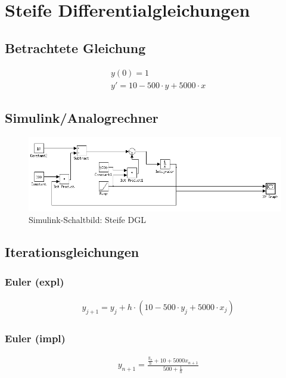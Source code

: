 \documentclass[10pt]{scrartcl}
\author{André Harm}
\title{\titletext}
\date{02.11.2011}
\begin{document}
\maketitle

\setcounter{tocdepth}{3}
\tableofcontents
\listoffigures
\lstlistoflistings


\section{Steife Differentialgleichungen}
	\subsection{Betrachtete Gleichung}
		\begin{align}
		&y(0) = 1\\
		&y' = 10 - 500 \cdot y + 5000 \cdot x
		\end{align}
		
	\subsection{Simulink/Analogrechner}
	
	\begin{figure}[htbp]
	\centering
		\includegraphics[scale=0.5]{simulink_aufg1_a}
	\caption{Simulink-Schaltbild: Steife DGL}
	\label{fig:simulinkAufg1}
	\end{figure}

	\subsection{Iterationsgleichungen}
		\subsubsection{Euler (expl)}
		\begin{align}
		&y_{j+1} = y_j + h \cdot ( 10 - 500 \cdot y_j + 5000 \cdot x_j )
		\end{align}				
		
		\subsubsection{Euler (impl)}
		\begin{align}
		&y_{n+1} = \frac{\frac{y_n}{h}+10+5000x_{n+1}}{500+\frac{1}{h}}
		\end{align}
		
\end{document}
